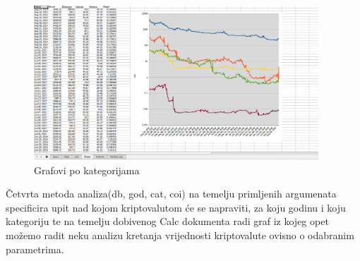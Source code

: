 \documentclass[a4paper,12pt]{foi}
\begin{document}
\begin{figure}[h]
\centering 
\includegraphics[width=0.95\textwidth]{grafovi.png}
\caption{Grafovi po kategorijama}
\label{slika-7}
\end{figure}


Četvrta metoda analiza(db, god, cat, coi) na temelju primljenih argumenata specificira upit nad kojom kriptovalutom će se napraviti, za koju godinu i koju kategoriju te na temelju dobivenog Calc dokumenta radi graf iz kojeg opet možemo radit neku analizu kretanja vrijednosti kriptovalute ovisno o odabranim parametrima.
\end{document}
